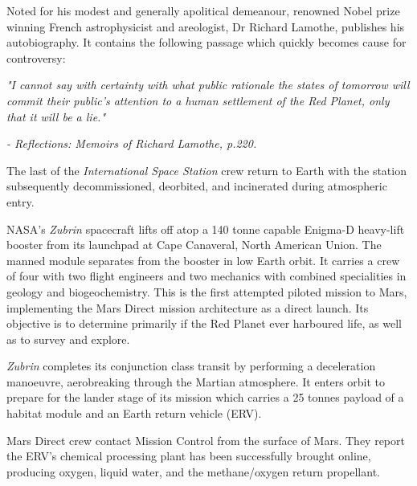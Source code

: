 

Noted for his modest and generally apolitical demeanour, renowned Nobel prize winning French astrophysicist and areologist, Dr Richard Lamothe, publishes his autobiography. It contains the following passage which quickly becomes cause for controversy:

\startTimelineGeneralDocument
{\it "I cannot say with certainty with what public rationale the states of tomorrow will commit their public's attention to a human settlement of the Red Planet, only that it will be a lie."}

\hskip 1.5cm {\it - Reflections: Memoirs of Richard Lamothe, p.220.}
\stopTimelineGeneralDocument
\StopTimelineDate

The last of the {\it International Space Station} crew return to Earth with the station subsequently decommissioned, deorbited, and incinerated during atmospheric entry.
\StopTimelineDate

NASA's {\it Zubrin} spacecraft lifts off atop a 140 tonne capable Enigma-D heavy-lift booster from its launchpad at Cape Canaveral, North American Union. The manned module separates from the booster in low Earth orbit. It carries a crew of four with two flight engineers and two mechanics with combined specialities in geology and biogeochemistry. This is the first attempted piloted mission to Mars, implementing the Mars Direct mission architecture as a direct launch. Its objective is to determine primarily if the Red Planet ever harboured life, as well as to survey and explore.
\StopTimelineDate

{\it Zubrin} completes its conjunction class transit by performing a deceleration manoeuvre, aerobreaking through the Martian atmosphere. It enters orbit to prepare for the lander stage of its mission which carries a 25 tonnes payload of a habitat module and an Earth return vehicle (ERV).
\StopTimelineDate

Mars Direct crew contact Mission Control from the surface of Mars. They report the ERV's chemical processing plant has been successfully brought online, producing oxygen, liquid water, and the methane/oxygen return propellant.
\StopTimelineDate

